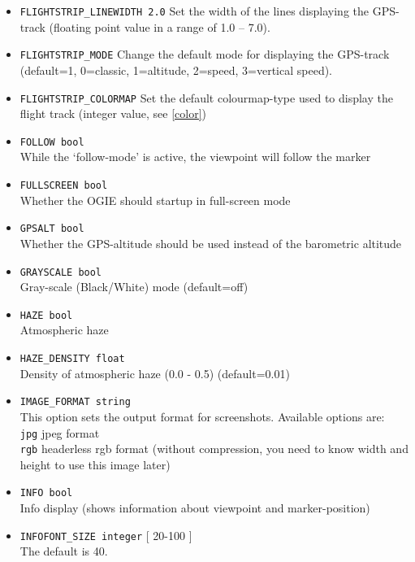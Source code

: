 \begin{itemize}
\item \texttt{FLIGHTSTRIP\_LINEWIDTH 2.0}
Set the width of the lines displaying the GPS-track (floating point value in a range of 1.0 -- 7.0).

\item \texttt{FLIGHTSTRIP\_MODE}
Change the default mode for displaying the GPS-track (default=1, 0=classic, 1=altitude, 2=speed, 3=vertical speed).

\item \texttt{FLIGHTSTRIP\_COLORMAP}
Set the default colourmap-type used to display the flight track (integer value, see \ref{color})


\item \texttt{FOLLOW bool} \\
While the `follow-mode' is active, the viewpoint will follow the marker

\item \texttt{FULLSCREEN bool} \\
Whether the OGIE should startup in full-screen mode

\item \texttt{GPSALT bool} \\
Whether the GPS-altitude should be used instead of the barometric altitude

\item \texttt{GRAYSCALE bool} \\
Gray-scale (Black/White) mode (default=off)

\item \texttt{HAZE bool} \\
Atmospheric haze

\item \texttt{HAZE\_DENSITY float} \\
Density of atmospheric haze (0.0 - 0.5) (default=0.01)

\item \texttt{IMAGE\_FORMAT string} \\
This option sets the output format for screenshots. Available options are: \\
\texttt{jpg} jpeg format \\
\texttt{rgb} headerless rgb format (without compression, you need to know width and height to use this image later)

\item \texttt{INFO bool} \\
Info display (shows information about viewpoint and marker-position)

\item \texttt{INFOFONT\_SIZE integer} [ 20-100 ] \\
The default is 40.


\end{itemize}

